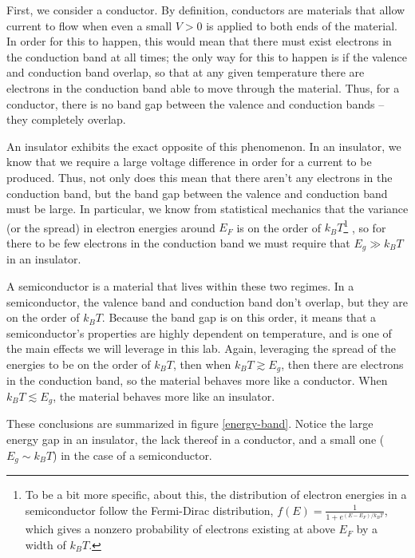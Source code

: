 \documentclass[10pt]{article}
\begin{document}
	First, we consider a conductor. By definition, conductors are materials that allow current to flow when
	even a small \( V > 0 \) is applied to both ends of the material.
	In order for this
	to happen, this would mean that there must exist electrons in the conduction band at all times; the
	only way for this to happen is if the valence and conduction band overlap, so that at any given
	temperature there are electrons in the conduction band able to move through the material. Thus, for a
	conductor, there is no band gap between the valence and conduction bands -- they completely overlap. 

	An insulator exhibits the exact opposite of this phenomenon. In an insulator, we know that we require a
	large voltage difference in order for a current to be produced. Thus, not only does this mean that there
	aren't any electrons in the conduction band, but the band gap between the valence and conduction band
	must be large. In particular, we know from statistical mechanics that the variance (or the spread) 
	in electron energies around \( E_F \) is on the order of \( k_BT \)\footnote{To be a bit more specific,
		about this, the distribution of electron energies in a semiconductor follow the Fermi-Dirac
		distribution, \( f(E) = \frac{1}{1 + e^{(E - E_F) / k_BT}} \), which gives a nonzero probability of
	electrons existing at above \( E_F \) by a width of \( k_BT \).} , so for there to be few electrons in
	the conduction band we must require that \( E_g \gg k_BT \) in an insulator.  

	A semiconductor is a material that lives within these two regimes. In a semiconductor, the valence band
	and conduction band don't overlap, but they are on the order of \( k_BT \). Because the band gap is on
	this order, it means that a semiconductor's properties are highly dependent on temperature, and is one
	of the main effects we will leverage in this lab. Again, leveraging the spread of the energies to be 
	on the order of \( k_BT \), then when \( k_BT \gtrsim E_g \), then there are electrons in the 
	conduction band, so the material behaves more like a conductor. When \( k_BT \lesssim E_g \), 
	the material behaves more like an insulator. 

	These conclusions are summarized in figure \ref{energy-band}. Notice the large energy gap in an
	insulator, the lack thereof in a conductor, and a small one (\( E_g \sim k_BT \)) in the case of a
	semiconductor.  
\end{document}
